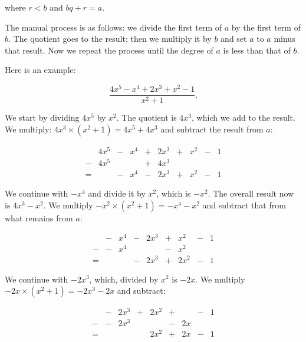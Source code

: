 \documentclass[tikz]{scrreprt}
\begin{document}
where $r < b$ and $bq+r=a$.

The manual process is as follows:
we divide the first term of $a$ by the first term of $b$.
The quotient goes to the result; then we multiply it by $b$
and set $a$ to $a$ minus that result.
Now we repeat the process
until the degree of $a$
is less than that of $b$.

Here is an example:

\[
\frac{4x^5 - x^4 + 2x^3 + x^2 - 1}{x^2 + 1}.
\]

We start by dividing $4x^5$ by $x^2$.
The quotient is $4x^3$, which we add to the result.
We multiply: $4x^3 \times (x^2 + 1) = 4x^5 + 4x^3$
and subtract the result from $a$:

\begin{equation}
\begin{array}{crcrcrcrcr}
  & 4x^5 & - &  x^4 & + & 2x^3 & + & x^2 & - & 1\\
- & 4x^5 &   &      & + & 4x^3 &   &     &   &  \\
= &      & - &  x^4 & - & 2x^3 & + & x^2 & - & 1
\end{array}
\end{equation}

We continue with
$-x^4$ and divide it by $x^2$, which is
$-x^2$. 
The overall result now is $4x^3 - x^2$.
We multiply $-x^2 \times (x^2 + 1) = -x^4 - x^2$
and subtract that from what remains from $a$:

\begin{equation}
\begin{array}{ccrcrcrcr}
  & - &  x^4 & - & 2x^3 & + &  x^2 & - & 1\\
- & - &  x^4 &   &      & - &  x^2 &   &  \\
= &   &      & - & 2x^3 & + & 2x^2 & - & 1
\end{array}
\end{equation}

We continue with $-2x^3$, which, divided by
$x^2$ is $-2x$. 
We multiply $-2x \times (x^2 + 1) = -2x^3 - 2x$
and subtract:

\begin{equation}
\begin{array}{ccrcrcrcr}
  & - & 2x^3 & + & 2x^2 & + &    & - & 1\\
- & - & 2x^3 &   &      & - & 2x &   &  \\
= &   &      &   & 2x^2 & + & 2x & - & 1 
\end{array}
\end{equation}
\end{document}
